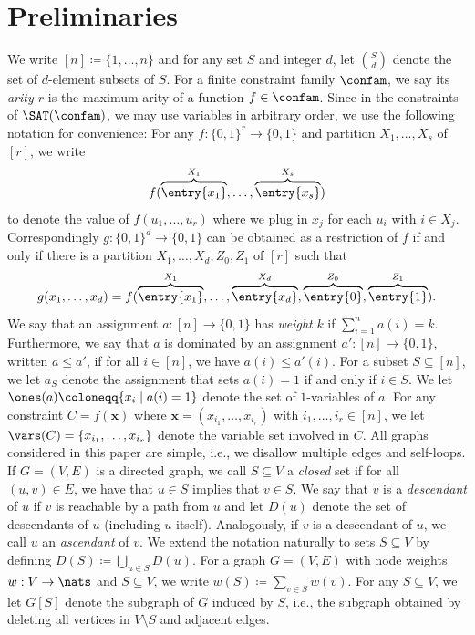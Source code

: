 \section{Preliminaries}
\label{sec:prelim}
%
We write $[n]\coloneqq \{1,\dots, n\}$ and for any set $S$ and integer $d$, let ${S \choose d}$ denote the set of $d$-element subsets of $S$.
%
For a finite constraint family $\confam$, we say its \emph{arity $r$} is the maximum arity of a function $f\in \confam$. Since in the constraints of $\SAT(\confam)$, we may use variables in arbitrary order, we use the following notation for convenience: For any $f:\{0,1\}^r \to \{0,1\}$ and partition $X_1,\dots, X_s$ of $[r]$, we write  
\[ f(\overbrace{\entry{x_1}}^{X_1},\dots, \overbrace{\entry{x_s}}^{X_s})\]
to denote the value of $f(u_1,\dots,u_r)$ where we plug in $x_j$ for each $u_i$ with $i\in X_j$. Correspondingly $g:\{0,1\}^d \to \{0,1\}$ can be obtained as a restriction of $f$ if and only if there is a partition $X_1,\dots, X_d, Z_0, Z_1$ of $[r]$ such that 
\[ g(x_1,\dots,x_d) = f(\overbrace{\entry{x_1}}^{X_1},\dots, \overbrace{\entry{x_d}}^{X_d}, \overbrace{\entry{0}}^{Z_0}, \overbrace{\entry{1}}^{Z_1}).\]
%
We say that an assignment $a: [n] \to \{0,1\}$ has \emph{weight} $k$ if $\sum_{i=1}^n a(i) = k$. Furthermore, we say that $a$ is dominated by an assignment $a': [n]\to \{0,1\}$, written $a\le a'$, if for all $i\in [n]$, we have $a(i) \le a'(i)$. For a subset $S\subseteq [n]$, we let $a_S$ denote the assignment that sets $a(i)=1$ if and only if $i\in S$. We let $\ones(a) \coloneqq \{ x_i \mid a(i) = 1\}$ denote the set of $1$-variables of $a$. For any constraint $C=f(\mathbf{x})$ where $\mathbf{x} = (x_{i_1},\dots,x_{i_r})$ with $i_1,\dots, i_r\in [n]$, we let $\vars(C) = \{x_{i_1},\dots,x_{i_r}\}$ denote the variable set involved in $C$.
%
%
All graphs considered in this paper are simple, i.e., we disallow multiple edges and self-loops. If $G=(V,E)$ is a directed graph, we call $S\subseteq V$ a \emph{closed} set if for all $(u,v)\in E$, we have that $u\in S$ implies that $v\in S$. We say that $v$ is a \emph{descendant} of $u$ if $v$ is reachable by a path from $u$ and let $D(u)$ denote the set of descendants of $u$ (including $u$ itself). Analogously, if $v$ is a descendant of $u$, we call $u$ an \emph{ascendant} of $v$. We extend the notation naturally to sets $S\subseteq V$ by defining $D(S) \coloneqq \bigcup_{u\in S} D(u)$.
For a graph $G=(V,E)$ with node weights $w: V\to \nats$ and $S\subseteq V$, we write $w(S) \coloneqq \sum_{v\in S}w(v)$. For any $S\subseteq V$, we let $G[S]$ denote the subgraph of $G$ induced by $S$, i.e., the subgraph obtained by deleting all vertices in $V\setminus S$ and adjacent edges.
%
